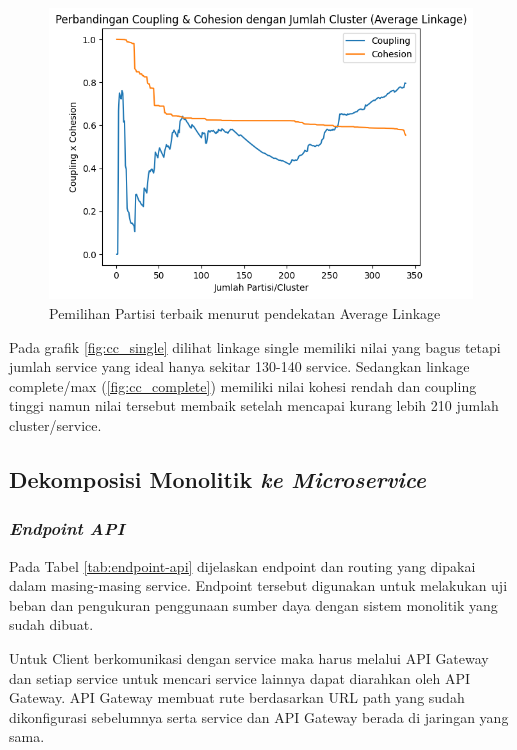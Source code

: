 \begin{figure}[htbp]
	\centering
	\begin{minipage}{1\textwidth}
		\centering
		\includegraphics[width=1\textwidth]{img/bab_4/cc_avg.png}
		\caption{Pemilihan Partisi terbaik menurut pendekatan Average Linkage }
		\label{fig:cc_avg}
	\end{minipage}\hfill	
\end{figure}


Pada grafik \ref{fig:cc_single} dilihat linkage single memiliki nilai yang bagus tetapi jumlah service yang ideal hanya sekitar 130-140 service. Sedangkan linkage complete/max (\ref{fig:cc_complete}) memiliki nilai kohesi rendah dan coupling tinggi namun nilai tersebut membaik setelah mencapai kurang lebih 210 jumlah cluster/service.\\


\subsection{Dekomposisi Monolitik \textit{ ke Microservice}}

\subsubsection{\textit{Endpoint API}}
Pada Tabel \ref{tab:endpoint-api} dijelaskan endpoint dan routing yang dipakai dalam masing-masing service. Endpoint tersebut digunakan untuk melakukan uji beban dan pengukuran penggunaan sumber daya dengan sistem monolitik yang sudah dibuat.  

Untuk Client berkomunikasi dengan service maka harus melalui API Gateway dan setiap service untuk mencari service lainnya dapat diarahkan oleh API Gateway. API Gateway membuat rute berdasarkan URL path yang sudah dikonfigurasi sebelumnya serta service dan API Gateway berada di jaringan yang sama.

